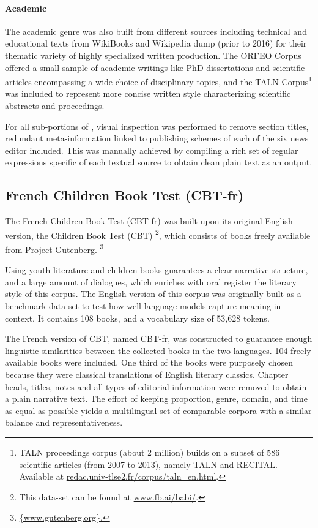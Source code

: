 \paragraph{\Cabernet Academic} \label{subsec:DescribeCaBeRnetAcad}
The academic genre was also built from different sources including technical and educational texts from WikiBooks and Wikipedia dump (prior to 2016) for their thematic variety of highly specialized written production. The \textsc{ORFEO} Corpus offered a small sample of academic writings like PhD dissertations and scientific articles encompassing a wide choice of disciplinary topics, and the TALN Corpus\footnote{TALN proceedings corpus (about 2 million) builds on a subset of 586 scientific articles (from 2007 to 2013), namely TALN and RECITAL. Available at \url{redac.univ-tlse2.fr/corpus/taln_en.html}.} was included to represent more concise written style characterizing scientific abstracts and proceedings.

For all sub-portions of \Cabernet, visual inspection was performed to remove section titles, redundant meta-information linked to publishing schemes of each of the six news editor included. This was manually achieved by compiling a rich set of regular expressions specific of each textual source to obtain clean plain text as an output.

\subsection{French Children Book Test (CBT-fr)}
\label{subsec:DescribeCBT}

The French Children Book Test (CBT-fr) was built upon its original English version, the Children Book Test (CBT) \citep{hill-etal-2016-the}\footnote{This data-set can be found at \url{www.fb.ai/babi/}.}, which consists of books freely available from Project Gutenberg. \footnote{\url{{www.gutenberg.org}.}}

Using youth literature and children books guarantees a clear narrative structure, and a large amount of dialogues, which enriches with oral register the literary style of this corpus. The English version of this corpus was originally built as a benchmark data-set to test how well language models capture meaning in context. It contains 108 books, and a vocabulary size of 53,628 tokens.

The French version of CBT, named CBT-fr, was constructed to guarantee enough linguistic similarities between the collected books in the two languages. 104 freely available books were included. One third of the books were purposely chosen because they were classical translations of English literary classics. Chapter heads, titles, notes and all types of editorial information were removed to obtain a plain narrative text. The effort of keeping proportion, genre, domain, and time as equal as possible yields a multilingual set of comparable corpora with a similar balance and representativeness.

